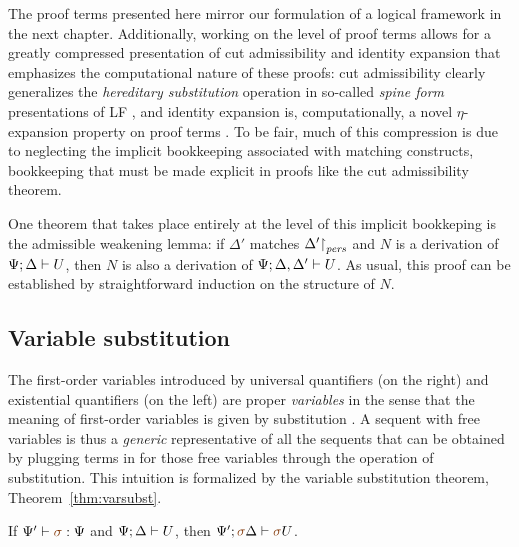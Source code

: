 The proof terms presented here mirror our formulation of a
logical framework in the next chapter.  Additionally, working on the
level of proof terms allows for a greatly compressed presentation of
cut admissibility and identity expansion that emphasizes the
computational nature of these proofs: cut admissibility clearly
generalizes the {\it hereditary substitution} operation in so-called {\it
  spine form} presentations of LF \cite{cervesato02linear}, and
identity expansion is, computationally, a novel $\eta$-expansion
property on proof terms \cite{simmons11structural}.  To be fair, much
of this compression is due to neglecting the implicit bookkeeping
associated with matching constructs, bookkeeping that must be made
explicit in proofs like the cut admissibility theorem.

One theorem that takes place entirely at the level of this implicit
bookkeping is the admissible weakening lemma: if $\Delta'$ matches
${\Delta'}{\upharpoonright}_{{\it pers}}$ and $N$ is a derivation of
${\Psi};{\Delta} \vdash {U} \mathstrut$, then $N$ is also a derivation of
${\Psi};{\Delta, \Delta'} \vdash {U} \mathstrut$. As usual, this proof can be
established by straightforward induction on the structure of $N$.

\subsection{Variable substitution}

The first-order variables introduced by universal quantifiers (on the
right) and existential quantifiers (on the left) are proper {\it
  variables} in the sense that the meaning of first-order variables is
given by substitution \cite[Chapter 1]{harper12practical}. A sequent
with free variables is thus a {\it generic} representative of all the
sequents that can be obtained by plugging terms in for those free
variables through the operation of substitution. This intuition is
formalized by the variable substitution theorem,
Theorem~\ref{thm:varsubst}.

\bigskip
\begin{theorem}
\label{thm:varsubst}
If $\Psi' \vdash \lf\sigma : \Psi$ and ${\Psi};{\Delta} \vdash {U} \mathstrut$, then 
$\foc{\Psi'}{\lf\sigma\Delta}{\lf\sigma{U}}$.
\end{theorem}

